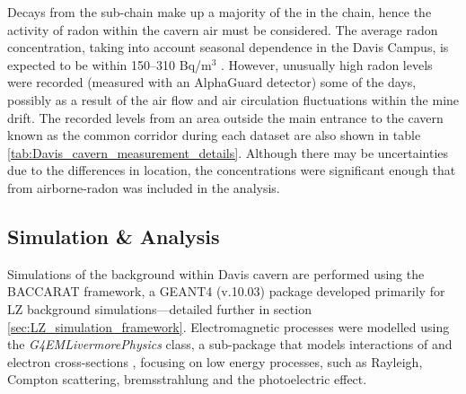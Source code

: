 Decays from the \RnTTT{} sub-chain make up a majority of the \grays{} in the \UTTE{} chain, hence the activity of radon within the cavern air must be considered. The average radon concentration, taking into account seasonal dependence in the Davis Campus, is expected to be within 150--310 Bq/m$^3$ \cite{Heise_2015}. However, unusually high radon levels were recorded (measured with an AlphaGuard detector) some of the days, possibly as a result of the air flow and air circulation fluctuations within the mine drift. The recorded levels from an area outside the main entrance to the cavern known as the common corridor during each dataset are also shown in table \ref{tab:Davis_cavern_measurement_details}. Although there may be uncertainties due to the differences in location, the concentrations were significant enough that \grays{} from airborne-radon was included in the analysis.




\subsection{Simulation \& Analysis}
\label{secsec:simulations_analysis}

Simulations of the \gray{} background within Davis cavern are performed using the \textsc{BACCARAT} framework, a \textsc{GEANT4} (v.10.03) \cite{Geant4} package developed primarily for LZ background simulations---detailed further in section \ref{sec:LZ_simulation_framework}. Electromagnetic processes were modelled using the \textit{G4EMLivermorePhysics} class, a sub-package that models interactions of \gray{} and electron cross-sections \cite{osti_295438, osti_5691165}, focusing on low energy processes, such as Rayleigh, Compton scattering, bremsstrahlung and the photoelectric effect. 

